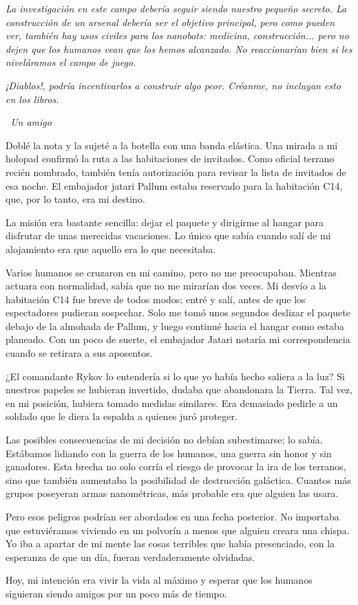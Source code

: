 \textit{La investigación en este campo debería seguir siendo nuestro pequeño secreto. La construcción de un arsenal debería ser el objetivo principal, pero como pueden ver, también hay usos civiles para los nanobots: medicina, construcción... pero no dejen que los humanos vean que los hemos alcanzado. No reaccionarían bien si les niveláramos el campo de juego.}

\textit{¡Diablos!, podría incentivarlos a construir algo peor. Créanme, no incluyan esto en los libros.}

\textit{~Un amigo}

Doblé la nota y la sujeté a la botella con una banda elástica. Una mirada a mi holopad confirmó la ruta a las habitaciones de invitados. Como oficial terrano recién nombrado, también tenía autorización para revisar la lista de invitados de esa noche. El embajador jatari Pallum estaba reservado para la habitación C14, que, por lo tanto, era mi destino.

La misión era bastante sencilla: dejar el paquete y dirigirme al hangar para disfrutar de unas merecidas vacaciones. Lo único que sabía cuando salí de mi alojamiento era que aquello era lo que necesitaba.

Varios humanos se cruzaron en mi camino, pero no me preocupaban. Mientras actuara con normalidad, sabía que no me mirarían dos veces. Mi desvío a la habitación C14 fue breve de todos modos; entré y salí, antes de que los espectadores pudieran sospechar. Solo me tomó unos segundos deslizar el paquete debajo de la almohada de Pallum, y luego continué hacia el hangar como estaba planeado. Con un poco de suerte, el embajador Jatari notaría mi correspondencia cuando se retirara a sus aposentos.

¿El comandante Rykov lo entendería si lo que yo había hecho saliera a la luz? Si nuestros papeles se hubieran invertido, dudaba que abandonara la Tierra. Tal vez, en mi posición, hubiera tomado medidas similares. Era demasiado pedirle a un soldado que le diera la espalda a quienes juró proteger.

Las posibles consecuencias de mi decisión no debían subestimarse; lo sabía. Estábamos lidiando con la guerra de los humanos, una guerra sin honor y sin ganadores. Esta brecha no solo corría el riesgo de provocar la ira de los terranos, sino que también aumentaba la posibilidad de destrucción galáctica. Cuantos más grupos poseyeran armas nanométricas, más probable era que alguien las usara.

Pero esos peligros podrían ser abordados en una fecha posterior. No importaba que estuviéramos viviendo en un polvorín a menos que alguien creara una chispa. Yo iba a apartar de mi mente las cosas terribles que había presenciado, con la esperanza de que un día, fueran verdaderamente olvidadas.

Hoy, mi intención era vivir la vida al máximo y esperar que los humanos siguieran siendo amigos por un poco más de tiempo.